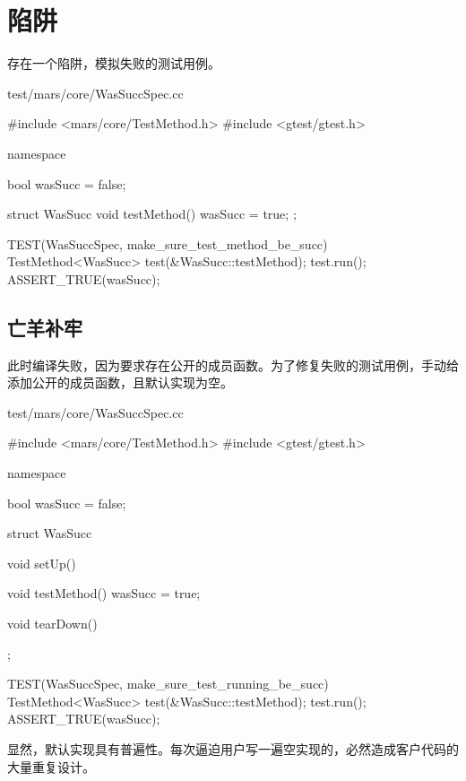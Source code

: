 \section{陷阱}

\begin{content}

存在一个陷阱，模拟失败的测试用例。

\begin{nodiff}{test/mars/core/WasSuccSpec.cc}
\begin{c++}
#include <mars/core/TestMethod.h>
#include <gtest/gtest.h>

namespace {
  bool wasSucc = false;

  struct WasSucc {
    void testMethod() {
      wasSucc = true;
    }
  };
}

TEST(WasSuccSpec, make_sure_test_method_be_succ) {
  TestMethod<WasSucc> test(&WasSucc::testMethod);
  test.run();
  ASSERT_TRUE(wasSucc);
}
\end{c++}
\end{nodiff}

\subsection{亡羊补牢}

此时编译失败，因为要求存在公开的成员函数。为了修复失败的测试用例，手动给添加公开的成员函数，且默认实现为空。

\begin{nodiff}{test/mars/core/WasSuccSpec.cc}
\begin{c++}
#include <mars/core/TestMethod.h>
#include <gtest/gtest.h>

namespace {
  bool wasSucc = false;

  struct WasSucc {
    void setUp() {
    }

    void testMethod() {
      wasSucc = true;
    }

    void tearDown() {
    }
  };
}

TEST(WasSuccSpec, make_sure_test_running_be_succ) {
  TestMethod<WasSucc> test(&WasSucc::testMethod);
  test.run();
  ASSERT_TRUE(wasSucc);
}
\end{c++}
\end{nodiff}

显然，默认实现具有普遍性。每次逼迫用户写一遍空实现的，必然造成客户代码的大量重复设计。


\end{content}

